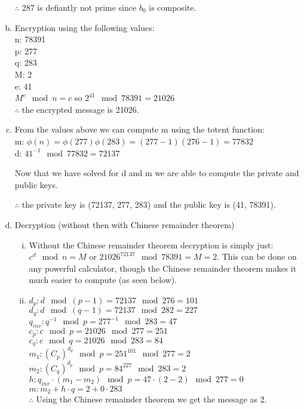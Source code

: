 \documentclass[fleqn, 12pt]{article}
\begin{document}
\begin{enumerate}[a)]
        $\therefore$ 287 is defiantly not prime since $b_0$ is composite.\\
    \item

        Encryption using the following values:\\
        n: 78391\\
        p: 277\\
        q: 283\\
        M: 2\\
        e: 41\\

        $M^e \mod n = c$ so $2^{41} \mod 78391 = 21026$\\

        $\therefore$ the encrypted message is 21026.
    \item
        From the values above we can compute m using the totent function:\\
        m: $\phi(n)=\phi(277)\phi(283)=(277-1)(276-1)=77832$\\
        d: $41^{-1} \mod 77832 = 72137$

        Now that we have solved for d and m we are able to compute the private and public keys.

        $\therefore$ the private key is (72137, 277, 283) and the public key is (41, 78391).
    \item
        Decryption (without then with Chinese remainder theorem)
        \begin{enumerate}[i)]
            \item
                Without the Chinese remainder theorem decryption is simply just: $c^d \mod n = M$ or $21026^{72137} \mod 78391 = M = 2$. This can be done on any powerful calculator, though the Chinese remainder theorem makes it much easier to compute (as seen below).
            \item
                $d_p: d \mod (p-1) = 72137 \mod 276 = 101$\\
                $d_q: d \mod (q-1) = 72137 \mod 282 = 227$\\
                $q_{inv}: q^{-1} \mod p = 277^{-1} \mod 283 = 47$\\
                $c_p: c \mod p = 21026 \mod 277 = 251$\\
                $c_q: c \mod q = 21026 \mod 283 = 84$\\
                $m_1: (C_p)^{d_p} \mod p = 251^{101} \mod 277 = 2$\\
                $m_2: (C_q)^{d_p} \mod p  = 84^{227} \mod 283 = 2$\\
                $h: q_{inv} \cdot (m_1 - m_2) \mod p = 47 \cdot (2-2) \mod 277 = 0$\\
                $m: m_2 + h \cdot q = 2 + 0 \cdot 283$\\

               $\therefore$ Using the Chinese remainder theorem we get the message as 2.
        \end{enumerate}
\end{enumerate}
\end{document}
